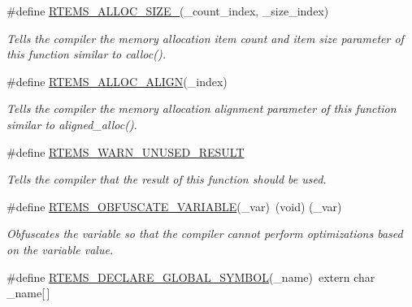 \begin{DoxyCompactItemize}
\mbox{\label{group__RTEMSScoreBaseDefs_ga9988f4196c26c826ca5a715240a463b8}} 
\#define \mbox{\hyperlink{group__RTEMSScoreBaseDefs_ga9988f4196c26c826ca5a715240a463b8}{R\+T\+E\+M\+S\+\_\+\+A\+L\+L\+O\+C\+\_\+\+S\+I\+Z\+E\+\_}}(\+\_\+count\+\_\+index,  \+\_\+size\+\_\+index)
\begin{DoxyCompactList}\small\item\em Tells the compiler the memory allocation item count and item size parameter of this function similar to calloc(). \end{DoxyCompactList}\item 
\mbox{\label{group__RTEMSScoreBaseDefs_ga444c15811193d14238084ae4aecd2773}} 
\#define \mbox{\hyperlink{group__RTEMSScoreBaseDefs_ga444c15811193d14238084ae4aecd2773}{R\+T\+E\+M\+S\+\_\+\+A\+L\+L\+O\+C\+\_\+\+A\+L\+I\+GN}}(\+\_\+index)
\begin{DoxyCompactList}\small\item\em Tells the compiler the memory allocation alignment parameter of this function similar to aligned\+\_\+alloc(). \end{DoxyCompactList}\item 
\mbox{\label{group__RTEMSScoreBaseDefs_gacd46c37056a29fdf53c3e8af6e8a4296}} 
\#define \mbox{\hyperlink{group__RTEMSScoreBaseDefs_gacd46c37056a29fdf53c3e8af6e8a4296}{R\+T\+E\+M\+S\+\_\+\+W\+A\+R\+N\+\_\+\+U\+N\+U\+S\+E\+D\+\_\+\+R\+E\+S\+U\+LT}}
\begin{DoxyCompactList}\small\item\em Tells the compiler that the result of this function should be used. \end{DoxyCompactList}\item 
\#define \mbox{\hyperlink{group__RTEMSScoreBaseDefs_ga55dfc714fe0b57dd818fcafbbdf6197a}{R\+T\+E\+M\+S\+\_\+\+O\+B\+F\+U\+S\+C\+A\+T\+E\+\_\+\+V\+A\+R\+I\+A\+B\+LE}}(\+\_\+var)~(void) (\+\_\+var)
\begin{DoxyCompactList}\small\item\em Obfuscates the variable so that the compiler cannot perform optimizations based on the variable value. \end{DoxyCompactList}\item 
\#define \mbox{\hyperlink{group__RTEMSScoreBaseDefs_ga8d8ce3b8a1955d337d30480d0bade613}{R\+T\+E\+M\+S\+\_\+\+D\+E\+C\+L\+A\+R\+E\+\_\+\+G\+L\+O\+B\+A\+L\+\_\+\+S\+Y\+M\+B\+OL}}(\+\_\+name)~extern char \+\_\+name\mbox{[}$\,$\mbox{]}

\end{DoxyCompactItemize}
